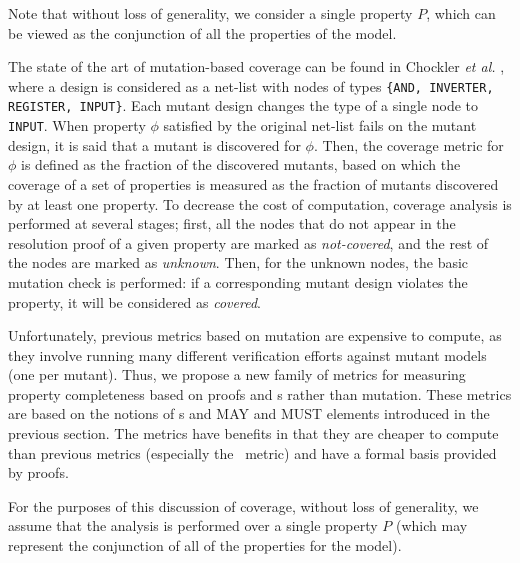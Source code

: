 \noindent Note that without loss of generality, we consider a single property $P$, which can be viewed as the conjunction of all the properties of the model.

The state of the art of mutation-based coverage can be found in Chockler \textit{et al.} \cite{chockler2010coverage}, where a design is considered as a net-list with nodes of types {\small \texttt{\{AND, INVERTER, REGISTER, INPUT\}}}.
Each mutant design changes the type of a single node to {\small \texttt{INPUT}}. When property $\phi$ satisfied by the original net-list fails on the mutant design, it is said that a mutant is discovered for $\phi$. Then, the coverage metric for $\phi$ is defined as the fraction of the discovered mutants, based on which the coverage of a set of properties is measured as the fraction of mutants discovered by at least one property.
To decrease the cost of computation, coverage analysis is performed at several stages; first, all the nodes that do not appear in the resolution proof of a given property are marked as \emph{not-covered}, and the rest of the nodes are marked as \emph{unknown}. Then, for the unknown nodes, the basic mutation check is performed: if a corresponding mutant design violates the property, it will be considered as \emph{covered}.
\fi

Unfortunately, previous metrics based on mutation are expensive to compute, as they involve running many different verification efforts against mutant models (one per mutant).  Thus, we propose a new family of metrics for measuring property completeness based on proofs and \mivc s rather than mutation.  These metrics are based on the notions of \mivc s and MAY and MUST elements introduced in the previous section.  The metrics have benefits in that they are cheaper to compute than previous metrics (especially the \mivc\ metric) and have a formal basis provided by proofs.  

For the purposes of this discussion of coverage, without loss of generality, we assume that the analysis is performed over a single property $P$ (which may represent the conjunction of all of the properties for the model).  



